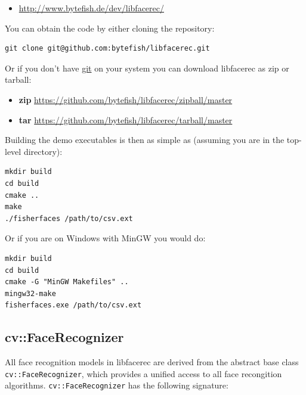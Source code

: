 \begin{itemize}
 \item \url{http://www.bytefish.de/dev/libfacerec/}
\end{itemize}

You can obtain the code by either cloning the repository:

\begin{lstlisting}
git clone git@github.com:bytefish/libfacerec.git
\end{lstlisting}

Or if you don't have \href{http://git-scm.com/}{git} on your system you can download libfacerec as zip or tarball:

\begin{itemize}
	\item \textbf{zip} \url{https://github.com/bytefish/libfacerec/zipball/master}
	\item \textbf{tar} \url{https://github.com/bytefish/libfacerec/tarball/master}
\end{itemize}

Building the demo executables is then as simple as (assuming you are in the top-level directory):

\begin{lstlisting}
mkdir build
cd build
cmake ..
make
./fisherfaces /path/to/csv.ext
\end{lstlisting}

Or if you are on Windows with MinGW you would do:

\begin{lstlisting}
mkdir build
cd build
cmake -G "MinGW Makefiles" ..
mingw32-make
fisherfaces.exe /path/to/csv.ext
\end{lstlisting}

\subsection{cv::FaceRecognizer}

All face recognition models in libfacerec are derived from the abstract base class \lstinline|cv::FaceRecognizer|, which provides a unified access to all face recongition algorithms. \lstinline|cv::FaceRecognizer| has the following signature:

